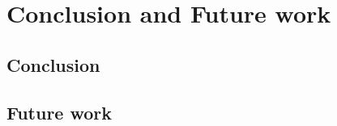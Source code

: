 \chapter{Conclusion and Future work}
\label{chapter:conclusion}

\section{Conclusion} %
\label{sec:conclusion}


\clearpage
\section{Future work} %
\label{sec:future_work}

